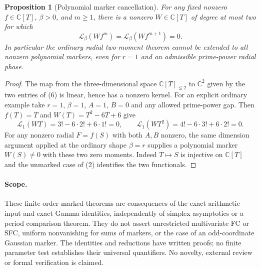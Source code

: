 \documentclass[11pt]{article}
\newtheorem{proposition}[theorem]{Proposition}
\newcommand{\C}{\mathbb C}
\newcommand{\Lbeta}{\mathcal L}
\begin{document}
\begin{proposition}[Polynomial marker cancellation]\label{prop:marker-boundary}
For any fixed nonzero $f\in\C[T]$, $\beta>0$, and $m\ge1$,
there is a nonzero $W\in\C[T]$ of degree at most two for which
\[
 \Lbeta_\beta(Wf^m)=\Lbeta_\beta(Wf^{m+1})=0.
 \tag{6}
\]
In particular the ordinary radial two-moment theorem cannot be extended
to all nonzero polynomial markers, even for $r=1$ and an admissible
prime-power radial phase.
\end{proposition}
\begin{proof}
The map from the three-dimensional space $\C[T]_{\le2}$ to $\C^2$
given by the two entries of (6) is linear, hence has a nonzero kernel.
For an explicit ordinary example take $r=1$, $\beta=1$, $A=1$,
$B=0$ and any allowed prime-power gap. Then $f(T)=T$ and
$W(T)=T^2-6T+6$ give
\[
 \Lbeta_1(WT)=3!-6\cdot2!+6\cdot1!=0,\qquad
 \Lbeta_1(WT^2)=4!-6\cdot3!+6\cdot2!=0 .
\]
For any nonzero radial $F=f(S)$ with both $A,B$ nonzero, the same
dimension argument applied at the ordinary shape $\beta=r$ supplies
a polynomial marker $W(S)\ne0$ with these two zero moments.
Indeed $T\mapsto S$ is injective on $\C[T]$ and the unmarked
case of (2) identifies the two functionals.
\end{proof}

\paragraph{Scope.}
These finite-order marked theorems are consequences of the exact
arithmetic input and exact Gamma identities, independently of simplex
asymptotics or a period comparison theorem. They do not assert
unrestricted multivariate FC or SFC, uniform nonvanishing for sums
of markers, or the case of an odd-coordinate Gaussian marker.
The identities and reductions have written proofs; no finite
parameter test establishes their universal quantifiers.
No novelty, external review or formal verification is claimed.
\end{document}
